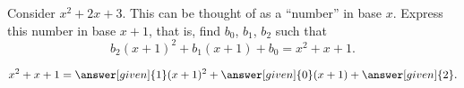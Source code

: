 \documentclass[nooutcomes]{ximera}
\begin{document}
\begin{problem}
Consider $x^2 + 2x + 3$.  This can be thought of as a ``number'' in base $x$.  Express this number in base $x+1$, that is, find $b_0$, $b_1$, $b_2$ such that 
\[
b_2(x+1)^2 + b_1(x+1) + b_0 = x^2 + x + 1.
\]
\begin{prompt}
\[
x^2 + x + 1 = \answer[given]{1}(x+1)^2 + \answer[given]{0}(x+1) + \answer[given]{2}.
\]
\end{prompt}
\end{problem}
\end{document}
